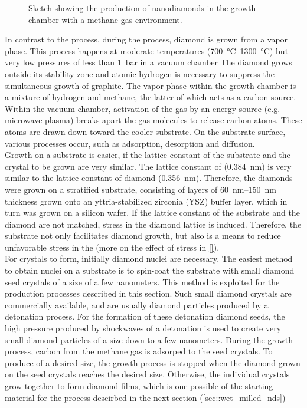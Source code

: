 	\begin{figure}[tp]
		\centering
		\caption{Sketch showing the production of \CVD nanodiamonds in the growth chamber with a methane gas environment.}
		\label{fig::cvd_sketch}
	\end{figure}

	In contrast to the \HPHT process,  during the \cvd process, diamond is grown from a vapor phase.
	This process happens at moderate temperatures (\SIrange{700}{1300}{\celsius}) but very low pressures of less than \SI{1}{\bar} in a vacuum chamber \cite{}
	The diamond grows outside its stability zone and atomic hydrogen is necessary to suppress the simultaneous growth of graphite.
	The vapor phase within the growth chamber is a mixture of hydrogen and methane, the latter of which acts as a carbon source.
	Within the vacuum chamber, activation of the gas by an energy source (e.g. microwave plasma) breaks apart the gas molecules to release carbon atoms. 
	These atoms are drawn down toward the cooler substrate.
	On the substrate surface, various processes occur, such as adsorption, desorption and diffusion.
	\\
	Growth on a substrate is easier, if the lattice constant of the substrate and the crystal to be grown are very similar.
	The lattice constant of \ir (\SI{0.384}{nm}\cite{Arblaster2010}) is very similar to the lattice constant of diamond (\SI{0.356}{nm}\cite{Davis1993}).
	Therefore, the diamonds were grown on a stratified substrate, consisting of \ir layers of \SIrange{60}{150}{nm} thickness grown onto an yttria-stabilized zirconia (YSZ) buffer layer, which in turn was grown on a silicon wafer.
	If the lattice constant of the substrate and the diamond are not matched, stress in the diamond lattice is induced.
	Therefore, the \ir substrate not only facilitates diamond growth, but also is a means to reduce unfavorable stress in the \nds (more on the effect of stress in \autoref{}).
	\\
	For crystals to form, initially diamond nuclei are necessary.
	The easiest method to obtain nuclei on a substrate is to spin-coat the substrate with small diamond seed crystals of a size of a few nanometers. 
	This method is exploited for the production processes described in this section.
	Such small diamond crystals are commercially available, and are usually diamond particles produced by a detonation process.
	For the formation of these detonation diamond seeds, the high pressure produced by shockwaves of a detonation is used to create very small diamond particles of a size down to a few nanometers.
	During the \CVD growth process, carbon from the methane gas is adsorped to the seed crystals.
	To produce \nds of a desired size, the growth process is stopped when the diamond grown on the seed crystals reaches the desired size. 
	Otherwise, the individual crystals grow together to form diamond films, which is one possible of the starting material for the process descirbed in the next section (\autoref{sec::wet_milled_nds})
	\\

